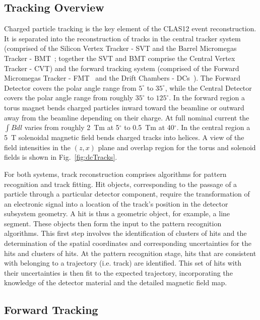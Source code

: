 \subsection{Tracking Overview}

Charged particle tracking is the key element of the CLAS12 event reconstruction. It is separated into the
reconstruction of tracks in the central tracker system (comprised of the Silicon Vertex Tracker - SVT
\cite{svt-nim} and the Barrel Micromegas Tracker - BMT~\cite{mm-nim}; together the SVT and BMT comprise
the Central Vertex Tracker - CVT)  and the forward tracking system (comprised of the Forward Micromegas
Tracker - FMT~\cite{mm-nim} and the Drift Chambers - DCs~\cite{dc-nim}). The Forward Detector covers the
polar angle range from $5^\circ$ to $35^\circ$, while the Central Detector covers the polar angle range from
roughly $35^\circ$ to $125^\circ$. In the forward region a torus magnet bends charged particles inward toward
the beamline or outward away from the beamline depending on their charge. At full nominal current the $\int B dl$
varies from roughly 2~Tm at 5$^\circ$ to 0.5~Tm at 40$^\circ$. In the central region a 5~T solenoidal magnetic
field bends charged tracks into helices. A view of the field intensities in the $(z,x)$ plane and overlap region for
the torus and solenoid fields is shown in Fig.~\ref{fig:dcTracks}.

For both systems, track reconstruction comprises algorithms for pattern recognition and track fitting. Hit objects,
corresponding to the passage of a particle through a particular detector component, require the transformation of
an electronic signal into a location of the track's position in the detector subsystem geometry. A hit is thus a
geometric object, for example, a line segment. These objects then form the input to the pattern recognition
algorithms. This first step involves the identification of clusters of hits and the determination of the spatial
coordinates and corresponding uncertainties for the hits and clusters of hits. At the pattern recognition stage, hits
that are consistent with belonging to a trajectory (i.e. track) are identified. This set of hits with their uncertainties
is then fit to the expected trajectory, incorporating the knowledge of the detector material and the detailed
magnetic field map.

\subsection{Forward Tracking}

